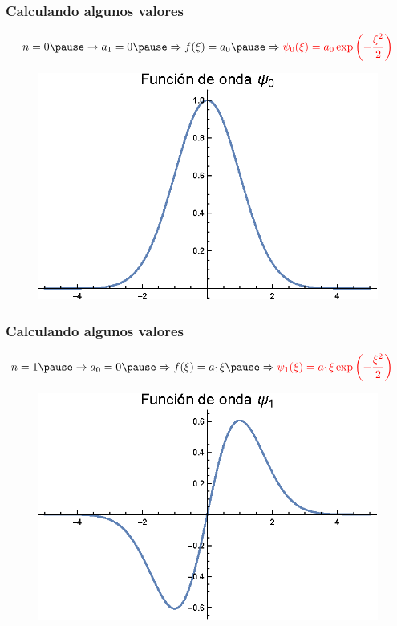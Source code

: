 \documentclass[12pt]{beamer}
\begin{document}
\begin{frame}
\frametitle{Calculando algunos valores}
\begin{eqnarray*}
n = 0 \pause \rightarrow a_{1} = 0 \pause \Rightarrow f(\xi) = a_{0} \pause \Rightarrow \textcolor{red}{\psi_{0}(\xi) = a_{0} \exp \left( - \dfrac{\xi^{2}}{2} \right)}
\end{eqnarray*}
\pause
\begin{figure}
    \centering
    \includegraphics[scale=0.7]{Imagenes/Funcion_Onda_Psi_0.eps}
\end{figure}
\end{frame}
\begin{frame}
\frametitle{Calculando algunos valores}
\begin{eqnarray*}
n &= 1 \pause \rightarrow a_{0} = 0 \pause \Rightarrow f(\xi) = a_{1} \xi \pause \Rightarrow \textcolor{red}{\psi_{1}(\xi) = a_{1} \xi \exp \left( - \dfrac{\xi^{2}}{2} \right)}
\end{eqnarray*}
\pause
\begin{figure}
    \centering
    \includegraphics[scale=0.65]{Imagenes/Funcion_Onda_Psi_1.eps}
\end{figure}
\end{frame}
\end{document}
